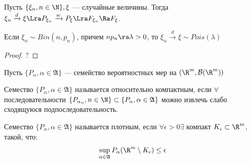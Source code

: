 \begin{corollary}
    Пусть \(\{\xi_n, n \in \N\}, \xi\) --- случайные величины. Тогда \(\xi_n \xrightarrow{d} \xi \Lra P_{\xi_n} \xrightarrow{w} P_\xi \Lra F_{\xi_n} \Ra F_\xi\).
\end{corollary}

\begin{theorem}[Пуассона]
    Если \(\xi_n \sim Bin(n, p_n)\), причем \(np_n \ra \lambda > 0\), то \(\xi_n \xrightarrow{d} \xi \sim Pois(\lambda)\)
\end{theorem}
\begin{proof}
    ?
\end{proof}

Пусть \(\{P_\alpha, \alpha \in \mathfrak{A}\}\) --- семейство вероятностных мер на \((\R^m, \mathcal{B}(\R^m))\)

\begin{definition}
    Семество \(\{P_\alpha, \alpha \in \mathfrak{A}\}\) называется относительно компактным, если \(\forall\) последовательности \(\{P_{\alpha_n}, n \in \N\} \subset \{P_\alpha, \alpha \in \mathfrak{A}\}\) можно извлечь слабо сходящуюся подпоследовательность.
\end{definition}

\begin{definition}
    Семество \(\{P_\alpha, \alpha \in \mathfrak{A}\}\) называется плотным, если \(\forall \epsilon > 0 \exists \) компакт \(K_\epsilon \subset \R^m\), такой, что:
    \[\sup_{\alpha \in \mathfrak{A}}P_\alpha(\R^m \setminus K_\epsilon) \le \epsilon\]
\end{definition}

